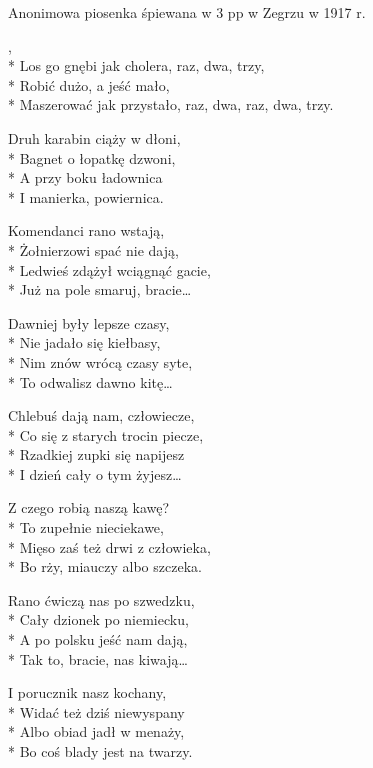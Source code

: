 \begin{info}Anonimowa piosenka śpiewana w 3 pp w Zegrzu w 1917 r.\end{info}

\begin{lyrics}[longestline={Maszerować jak przystało, raz, dwa, raz, dwa, trzy.}]

,\\*
Los go gnębi jak cholera, raz, dwa, trzy,\\*
Robić dużo, a jeść mało,\\*
Maszerować jak przystało, raz, dwa, raz, dwa, trzy.

Druh karabin ciąży w dłoni,\\*
Bagnet o łopatkę dzwoni,\\*
A przy boku ładownica\\*
I manierka, powiernica.

Komendanci rano wstają,\\*
Żołnierzowi spać nie dają,\\*
Ledwieś zdążył wciągnąć gacie,\\*
Już na pole smaruj, bracie\ldots

Dawniej były lepsze czasy,\\*
Nie jadało się kiełbasy,\\*
Nim znów wrócą czasy syte,\\*
To odwalisz dawno kitę\ldots

Chlebuś dają nam, człowiecze,\\*
Co się z starych trocin piecze,\\*
Rzadkiej zupki się napijesz\\*
I dzień cały o tym żyjesz\ldots

Z czego robią naszą kawę?\\*
To zupełnie nieciekawe,\\*
Mięso zaś też drwi z człowieka,\\*
Bo rży, miauczy albo szczeka.

Rano ćwiczą nas po szwedzku,\\*
Cały dzionek po niemiecku,\\*
A po polsku jeść nam dają,\\*
Tak to, bracie, nas kiwają\ldots

I porucznik nasz kochany,\\*
Widać też dziś niewyspany\\*
Albo obiad jadł w menaży,\\*
Bo coś blady jest na twarzy.
\end{lyrics}



